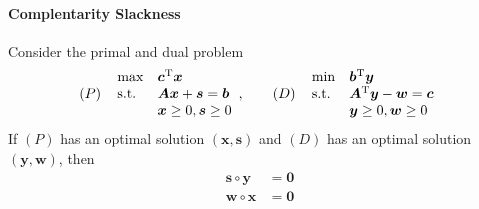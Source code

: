 \paragraph{Complentarity Slackness}
\begin{theorem}
Consider the primal and dual problem
\[
(P)\ \ \begin{array}{ll}
\max&\bm c\trans\bm x\\
\text{s.t.}&\bm A\bm x+\bm s=\bm b\\
&\bm x\ge0,\bm s\ge0
\end{array},\qquad
(D)\ \ 
\begin{array}{ll}
\min&\bm b\trans\bm y\\
\text{s.t.}&\bm A\trans\bm y-\bm w=\bm c\\
&\bm y\ge0,\bm w\ge0
\end{array}
\]
If $(P)$ has an optimal solution $(\bm x,\bm s)$ and $(D)$ has an optimal solution $(\bm y,\bm w)$, then
\begin{align*}
\bm s\circ\bm y&=\bm0\\
\bm w\circ\bm x&=\bm0
\end{align*}
\end{theorem}

